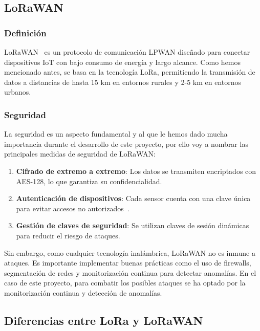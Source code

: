 \subsection{LoRaWAN}

\subsubsection{Definición}

LoRaWAN~\cite{Mono:Lorawan} es un protocolo de comunicación LPWAN diseñado para conectar dispositivos IoT con bajo consumo de energía y largo alcance. Como hemos mencionado antes, se basa en la tecnología LoRa, permitiendo la transmisión de datos a distancias de hasta 15 km en entornos rurales y 2-5 km en entornos urbanos.

\subsubsection{Seguridad}

La seguridad es un aspecto fundamental y al que le hemos dado mucha importancia durante el desarrollo de este proyecto, por ello voy a nombrar las principales medidas de seguridad de LoRaWAN:

\begin{enumerate}
   \item \textbf{Cifrado de extremo a extremo}: Los datos se transmiten encriptados con AES-128, lo que garantiza su confidencialidad.
    \item \textbf{Autenticación de dispositivos}: Cada sensor cuenta con una clave única para evitar accesos no autorizados~\cite{TTN:Sec}.
    \item \textbf{Gestión de claves de seguridad}: Se utilizan claves de sesión dinámicas para reducir el riesgo de ataques.
\end{enumerate}

Sin embargo, como cualquier tecnología inalámbrica, LoRaWAN no es inmune a ataques. Es importante implementar buenas prácticas como el uso de firewalls, segmentación de redes y monitorización continua para detectar anomalías. En el caso de este proyecto, para combatir los posibles ataques se ha optado por la monitorización continua y detección de anomalías. 

\subsection{Diferencias entre LoRa y LoRaWAN}

